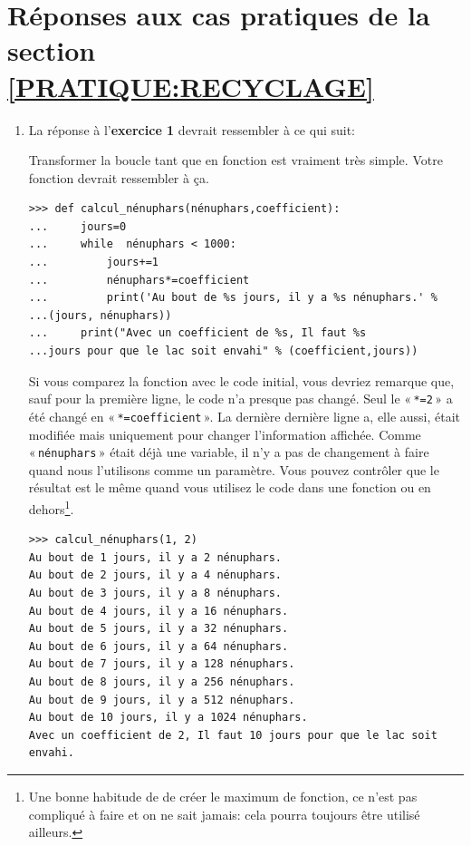 \section{Réponses aux cas pratiques de la section  \ref{PRATIQUE:RECYCLAGE}\label{REPONSES:RECYCLAGE}}
\begin{enumerate}
\item La réponse à l'\textbf{exercice 1} devrait ressembler à ce qui suit: 

Transformer la boucle tant que en fonction est vraiment très simple. Votre fonction devrait ressembler à ça.

\begin{Verbatim}[frame=single,rulecolor=\color{mbleu}, label=à taper]
>>> def calcul_nénuphars(nénuphars,coefficient):
...     jours=0
...     while  nénuphars < 1000:
...         jours+=1
...         nénuphars*=coefficient
...         print('Au bout de %s jours, il y a %s nénuphars.' % 
...(jours, nénuphars))
...     print("Avec un coefficient de %s, Il faut %s 
...jours pour que le lac soit envahi" % (coefficient,jours))
\end{Verbatim}

Si vous comparez la fonction avec le code initial, vous devriez remarque que, sauf pour la première ligne, le code n'a presque pas changé. Seul le « \texttt{*=2} » a été changé en « \texttt{*=coefficient} ». La dernière dernière ligne a, elle aussi, était modifiée mais uniquement pour changer l'information affichée. Comme « \texttt{nénuphars} » était déjà une variable, il n'y a pas de changement à faire quand nous l'utilisons comme un paramètre. Vous pouvez contrôler que le résultat est le même quand vous utilisez le code dans une fonction ou en dehors\footnote{Une bonne habitude de de créer le maximum de fonction, ce n'est pas compliqué à faire et on ne sait jamais: cela pourra toujours être utilisé ailleurs.}.

\begin{Verbatim}[frame=single,rulecolor=\color{mbleu}, label=à taper]
>>> calcul_nénuphars(1, 2)
Au bout de 1 jours, il y a 2 nénuphars.
Au bout de 2 jours, il y a 4 nénuphars.
Au bout de 3 jours, il y a 8 nénuphars.
Au bout de 4 jours, il y a 16 nénuphars.
Au bout de 5 jours, il y a 32 nénuphars.
Au bout de 6 jours, il y a 64 nénuphars.
Au bout de 7 jours, il y a 128 nénuphars.
Au bout de 8 jours, il y a 256 nénuphars.
Au bout de 9 jours, il y a 512 nénuphars.
Au bout de 10 jours, il y a 1024 nénuphars.
Avec un coefficient de 2, Il faut 10 jours pour que le lac soit 
envahi.
\end{Verbatim}


\end{enumerate}
